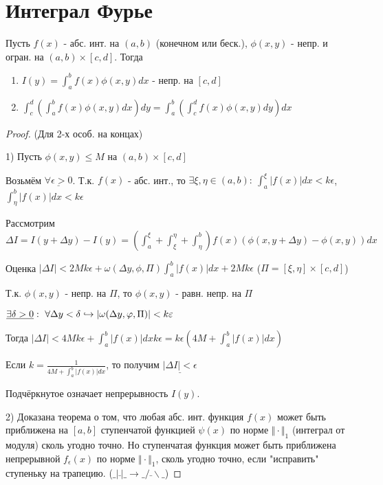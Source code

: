 \documentclass{article}
\begin{document}
\section{Интеграл Фурье}
\begin{lemma}
  Пусть $f(x)$ - абс. инт. на $(a,b)$ (конечном или беск.), $\phi(x,y)$ - непр. и огран.
  на $(a,b)\times [c,d]$. Тогда
  \begin{enumerate}
    \item $I(y)=\int_{a}^{b}f(x)\phi(x,y)dx$ - непр. на $[c,d]$
    \item $\int_{c}^{d}(\int_{a}^{b}f(x)\phi(x,y)dx)dy=\int_{a}^{b}(\int_{c}^{d}f(x)\phi(x,y)dy)dx$
  \end{enumerate}
\end{lemma}
\begin{proof}(Для 2-х особ. на концах)

  1) Пусть $\phi(x,y)\le M$ на $(a,b)\times [c,d]$

  Возьмём $\underline{\forall \epsilon > 0}$. Т.к. $f(x)$ - абс. инт., то
  $\exists \xi, \eta \in (a,b): \ \int_{a}^{\xi}|f(x)|dx < k \epsilon$,
  $\int_{\eta}^{b}|f(x)|dx < k \epsilon$

  Рассмотрим $\Delta I =I(y+\Delta y) - I(y) = (\int_{a}^{\xi}+\int_{\xi}^{\eta}+\int_{\eta}^{b})f(x)(\phi(x,y+\Delta y) - \phi(x,y))dx$

  Оценка $|\Delta I| < 2Mk\epsilon + \omega(\Delta y, \phi, \Pi) \int_{a}^{b}|f(x)|dx + 2Mk\epsilon$ ($\Pi = [\xi,\eta]\times [c,d]$)

  Т.к. $\phi(x,y)$ - непр. на $\Pi$, то $\phi(x,y)$ - равн. непр. на $\Pi$

  $\underline{\exists \delta >0}: \ \forall \Delta y < \delta \true |\omega(\Delta y, \phi, \Pi)| < k\epsilon$
  
  Тогда $|\Delta I|< 4Mk\epsilon + \int_{a}^{b}|f(x)|dx k\epsilon = k\epsilon(4M+\int_{a}^{b}|f(x)|dx)$
  
  Если $k=\frac{1}{4M + \int_{a}^{b}|f(x)|dx}$, то получим $\underline{|\Delta I| < \epsilon}$

  Подчёркнутое означает непрерывность $I(y)$.

  2) Доказана теорема о том, что любая абс. инт. функция $f(x)$ может быть приближена на $[a,b]$
  ступенчатой функцией $\psi(x)$ по норме $\Vert \cdot \Vert_{1}$ (интеграл от модуля) сколь 
  угодно точно. Но ступенчатая функция может быть приближена непрерывной $f_{\epsilon}(x)$ по норме
  $\Vert \cdot \Vert_{1}$, сколь угодно точно, если "исправить" ступеньку на трапецию.
  ($\_|\bar{}|\_ \rightarrow \_/\bar{}\backslash \_$)


\end{proof}
\end{document}

